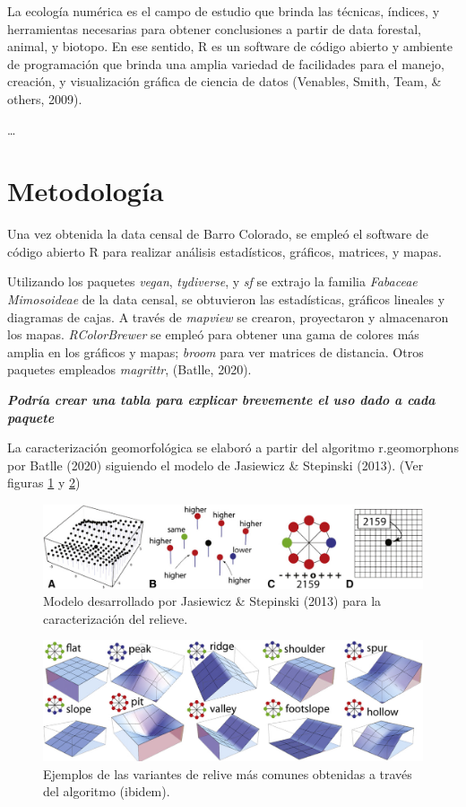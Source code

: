 \documentclass[11pt,]{article}
\begin{document}
La ecología numérica es el campo de estudio que brinda las técnicas,
índices, y herramientas necesarias para obtener conclusiones a partir de
data forestal, animal, y biotopo. En ese sentido, R es un software de
código abierto y ambiente de programación que brinda una amplia variedad
de facilidades para el manejo, creación, y visualización gráfica de
ciencia de datos (Venables, Smith, Team, \& others, 2009).

\ldots

\section{Metodología}\label{metodologuxeda}

Una vez obtenida la data censal de Barro Colorado, se empleó el software
de código abierto R para realizar análisis estadísticos, gráficos,
matrices, y mapas.

Utilizando los paquetes \emph{vegan}, \emph{tydiverse}, y \emph{sf} se
extrajo la familia \emph{Fabaceae Mimosoideae} de la data censal, se
obtuvieron las estadísticas, gráficos lineales y diagramas de cajas. A
través de \emph{mapview} se crearon, proyectaron y almacenaron los
mapas. \emph{RColorBrewer} se empleó para obtener una gama de colores
más amplia en los gráficos y mapas; \emph{broom} para ver matrices de
distancia. Otros paquetes empleados \emph{magrittr}, (Batlle, 2020).

\textbf{\emph{Podría crear una tabla para explicar brevemente el uso
dado a cada paquete}}

La caracterización geomorfológica se elaboró a partir del algoritmo
r.geomorphons por Batlle (2020) siguiendo el modelo de Jasiewicz \&
Stepinski (2013). (Ver figuras \ref{Geomorf3} y \ref{Geomorf2})

\begin{figure}
\centering
\includegraphics[width=1.00000\textwidth]{Geomorf3.png}
\caption{Modelo desarrollado por Jasiewicz \& Stepinski (2013) para la
caracterización del relieve.\label{Geomorf3}}
\end{figure}

\begin{figure}
\centering
\includegraphics[width=1.00000\textwidth]{Geomor2.png}
\caption{Ejemplos de las variantes de relive más comunes obtenidas a
través del algoritmo (ibidem).\label{Geomorf2}}
\end{figure}
\end{document}
